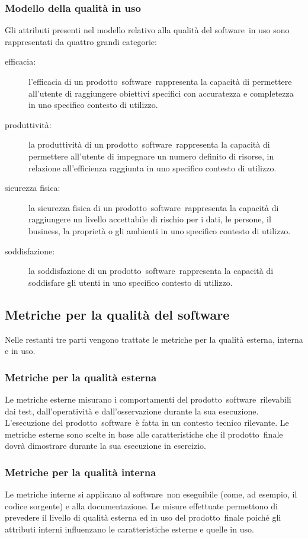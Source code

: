 \documentclass[../PianoDiQualifica.tex]{subfiles}
\begin{document}
\begin{appendices}
		\subsubsection{Modello della qualità in uso}
		Gli attributi presenti nel modello relativo alla qualità del software\g\ in uso sono rappresentati da quattro grandi categorie:
		\begin{description}
			\item[efficacia:] l'efficacia di un prodotto\g\ software\g\ rappresenta la capacità di permettere all'utente di raggiungere obiettivi specifici con accuratezza e completezza in uno specifico contesto di utilizzo.
			\item[produttività:] la produttività di un prodotto\g\ software\g\ rappresenta la capacità di permettere all'utente di impegnare un numero definito di risorse, in relazione all’efficienza raggiunta in uno specifico contesto di utilizzo.
			\item[sicurezza fisica:] la sicurezza fisica di un prodotto\g\ software\g\ rappresenta la capacità di raggiungere un livello accettabile di rischio per i dati, le persone, il business, la proprietà o gli ambienti in uno specifico contesto di utilizzo.
			\item[soddisfazione:] la soddisfazione di un prodotto\g\ software\g\ rappresenta la capacità di soddisfare gli utenti in uno specifico contesto di utilizzo.
		\end{description}
	
	\subsection{Metriche per la qualità del software}
	Nelle restanti tre parti vengono trattate le metriche per la qualità esterna, interna e in uso.
	
	\subsubsection{Metriche per la qualità esterna}
	Le metriche esterne misurano i comportamenti del prodotto\g\ software\g\ rilevabili dai test, dall'operatività e dall'osservazione durante la sua esecuzione. L'esecuzione del prodotto\g\ software\g\ è fatta in un contesto tecnico rilevante.
	Le metriche esterne sono scelte in base alle caratteristiche che il prodotto\g\ finale dovrà dimostrare durante la sua esecuzione in esercizio.
	
	\subsubsection{Metriche per la qualità interna}
	Le metriche interne si applicano al software\g\ non eseguibile (come, ad esempio, il codice sorgente) e alla documentazione. Le misure effettuate permettono di prevedere il livello di qualità esterna ed in uso del prodotto\g\ finale poiché gli attributi interni influenzano le caratteristiche esterne e quelle in uso.
	

\end{appendices}
\end{document}
